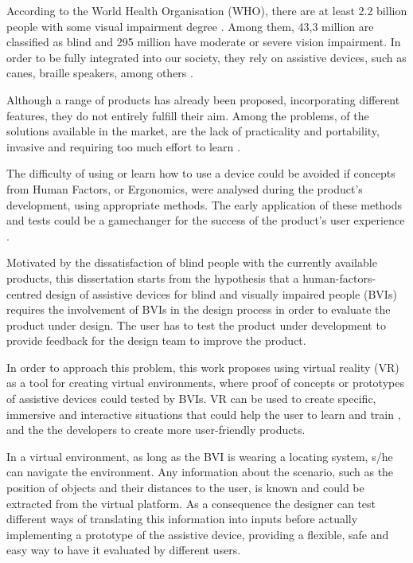 

According to the World Health Organisation (WHO), there are at least 2.2 billion people with some visual impairment degree \cite{world2019world}. Among them, 43,3 million are classified as blind and 295 million have moderate or severe vision impairment. In order to be fully integrated into our society, they rely on assistive devices, such as canes, braille speakers, among others \cite{bourne2021trends}. 

Although a range of products has already been proposed, incorporating different features, they do not entirely fulfill their aim. Among the problems, of the solutions available in the market, are the lack of practicality and portability, invasive and requiring too much effort to learn \cite{lozano2009electrotactile}.

The difficulty of using or learn how to use a device could be avoided if concepts from Human Factors, or Ergonomics, were analysed during the product’s development, using appropriate methods. The early application of these methods and tests could be a gamechanger for the success of the product's user experience \cite{wolf2019towards}.

Motivated by the dissatisfaction of blind people with the currently available products, this dissertation starts from the hypothesis that a human-factors-centred design of assistive devices for blind and visually impaired people (BVIs) requires the involvement of BVIs in the design process in order to evaluate the product under design. The user has to test the product under development to provide feedback for the design team to improve the product.

In order to approach this problem, this work proposes using virtual reality (VR) as a tool for creating virtual environments, where proof of concepts or prototypes of assistive devices could tested by BVIs. VR can be used to create specific, immersive and interactive situations that could help the user to learn and train \cite{farrell2018learning}, and the the developers to create more user-friendly products.

In a virtual environment, as long as the BVI is wearing a locating system, s/he can navigate the environment. Any information about the scenario, such as the position of objects and their distances to the user, is known and could be extracted from the virtual platform. As a consequence the designer can test different ways of translating this information into inputs before actually implementing a prototype of the assistive device, providing a flexible, safe and easy way to have it evaluated by different users.

